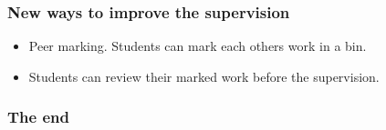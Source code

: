 \documentclass{beamer}
\begin{document}
    \begin{frame}
    	\frametitle{New ways to improve the supervision}
    	\begin{itemize}
    		\item Peer marking. Students can mark each others work in a bin.
    		\item Students can review their marked work before the supervision.
 
    	\end{itemize}
    \end{frame}
    \begin{frame}
    	\frametitle{The end}
    \end{frame}
\end{document}

